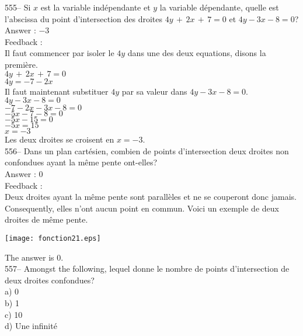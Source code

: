 ﻿\documentclass[letterpaper, 12pt]{article}
\begin{document}
555-- Si $x$ est la variable ind\'ependante et $y$ la variable d\'ependante,
quelle est l'abscissa du point d'intersection des droites
$4y\,+\,2x\,+\,7=0$ et $4y-3x-8=0$?\\

Answer : $-3$\\

Feedback : \\
Il faut commencer par isoler le $4y$ dans une des deux equations, disons
la premi\`ere.\\
$4y\,+\,2x\,+\,7=0$\\
$4y=-7-2x$\\

Il faut maintenant substituer $4y$ par sa valeur dans $4y-3x-8=0$.\\
$4y-3x-8=0$\\
$-7-2x-3x-8=0$\\
$-5x-7-8=0$\\
$-5x-15=0$\\
$-5x=15$\\
$x=-3$\\
Les deux droites se croisent en $x=-3$.\\

556-- Dans un plan cart\'esien, combien de points d'intersection deux
droites non confondues ayant la m\^eme pente ont-elles?\\

Answer : 0\\

Feedback :\\
Deux droites ayant la m\^eme pente sont parall\`eles et ne se couperont donc
jamais.  Consequently, elles n'ont aucun point en commun.  Voici un
exemple de deux droites de m\^eme pente.\\
    \begin{center}
    \texttt{[image: fonction21.eps]}
    \end{center}

The answer is 0.\\



557-- Amongst the following, lequel donne le nombre de points
d'intersection de deux droites confondues?\\
a) 0\\
b) 1\\
c) 10\\
d) Une infinit\'e\\
\end{document}
